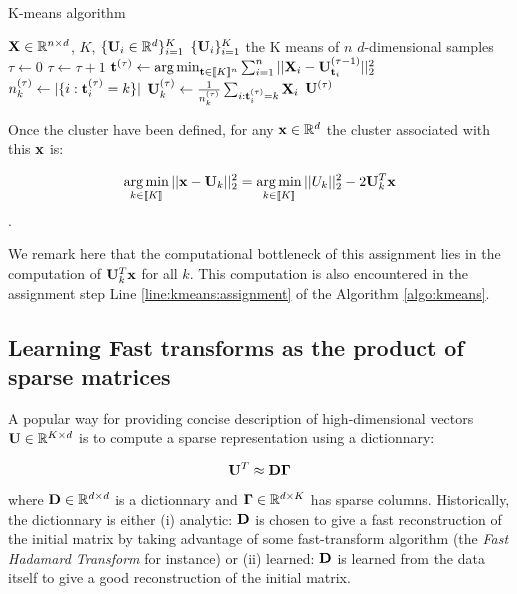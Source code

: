 \documentclass{article}
\def\rmGamma{{\mathbf{\Gamma}}}
\begin{document}
\begin{algorithm}
\caption{K-means algorithm}
\label{algo:kmeans}
\begin{algorithmic}[1]


\REQUIRE ${\mathbf{X}} \in \mathbb{R}^{n \times d}$, $K$, $\{{\mathbf{U}}_i \in \mathbb{R}^d\}_{i=1}^{K}$
\ENSURE $\{{\mathbf{U}}_i\}_{i=1}^{K}$ the K means of $n$ $d$-dimensional samples
\STATE $\tau \leftarrow 0$
\REPEAT
\STATE $\tau \leftarrow \tau + 1$
\STATE ${\mathbf{t}}^{(\tau)} \leftarrow \operatorname*{arg\,min}_{{\mathbf{t}} \in [\![K]\!]^n} \sum_{i=1}^{n} {||{\mathbf{X}}_i - {\mathbf{U}}^{(\tau-1)}_{{\mathbf{t}}_i}||_2^2}$
\label{line:kmeans:assignment}
\STATE $n_k^{(\tau)} \leftarrow |\{i: {\mathbf{t}}^{(\tau)}_i=k\}|$
\label{line:kmeans:count}
\STATE ${\mathbf{U}}^{(\tau)}_k \leftarrow \frac{1}{n_k^{(\tau)}} \sum_{i: {\mathbf{t}}^{(\tau)}_i = k} {{\mathbf{X}}_i}$
\label{line:kmeans:compute_means}
\ENDFOR
{}
\RETURN ${\mathbf{U}}^{(\tau)}$
\end{algorithmic}
\end{algorithm}


Once the cluster have been defined, for any ${\mathbf{x}} \in \mathbb{R}^d$ the cluster associated with this ${\mathbf{x}}$ is:

\begin{equation}
\label{eq:assignment_problem_kmeans}
\operatorname*{arg\,min}_{k \in [\![K]\!]} ||{\mathbf{x}} - {\mathbf{U}}_{k}||_2^2 = \operatorname*{arg\,min}_{k \in [\![K]\!]} ||U_k||_2^2 - 2 {\mathbf{U}}_{k}^T{\mathbf{x}}
\end{equation}.


We remark here that the computational bottleneck of this assignment lies in the computation of ${\mathbf{U}}_k^T{\mathbf{x}}$ for all $k$. This computation is also encountered in the assignment step Line \ref{line:kmeans:assignment} of the Algorithm \ref{algo:kmeans}.


\subsection{Learning Fast transforms as the product of sparse matrices}

A popular way for providing concise description of high-dimensional vectors ${\mathbf{U}} \in \mathbb{R}^{K \times d}$ is to compute a sparse representation using a dictionnary:

\begin{equation}
\rmU^T \approx \rmD\rmGamma
\end{equation}

where ${\mathbf{D}} \in \mathbb{R}^{d \times d}$ is a dictionnary and $\rmGamma \in \R^{d \times K}$ has sparse columns. Historically, the dictionnary is either (i) analytic: ${\mathbf{D}}$ is chosen to give a fast reconstruction of the initial matrix by taking advantage of some fast-transform algorithm (the \textit{Fast Hadamard Transform} for instance) or (ii) learned: ${\mathbf{D}}$ is learned from the data itself to give a good reconstruction of the initial matrix.
\end{document}
